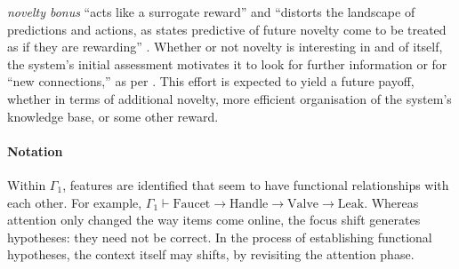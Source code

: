 \begin{description}
  \emph{novelty bonus} ``acts like a surrogate reward'' and ``distorts
  the landscape of predictions and actions, as states predictive of
  future novelty come to be treated as if they are rewarding''
  \cite[p.~554]{kakade2002dopamine}.  Whether or not novelty is
  interesting in and of itself, the system's initial assessment
  motivates it to look for further information or for ``new
  connections,'' as per \citet{Makri2012a}.  This effort is expected
  to yield a future payoff, whether in terms of additional novelty,
  more efficient organisation of the system's knowledge base, or some
  other reward.
\end{description}

\paragraph{\textbf{\upshape Notation}}

Within $\Gamma_1$, features are identified that seem to have
functional relationships with each other.  For example, $\Gamma_1
\vdash \mathrm{Faucet} \rightarrow \mathrm{Handle} \rightarrow
\mathrm{Valve} \rightarrow \mathrm{Leak}$. Whereas attention only
changed the way items come online, the focus shift generates
hypotheses: they need not be correct.  In the process of establishing
functional hypotheses, the context itself may shifts, by revisiting
the attention phase.


\begin{center}
\asterism
\end{center}



